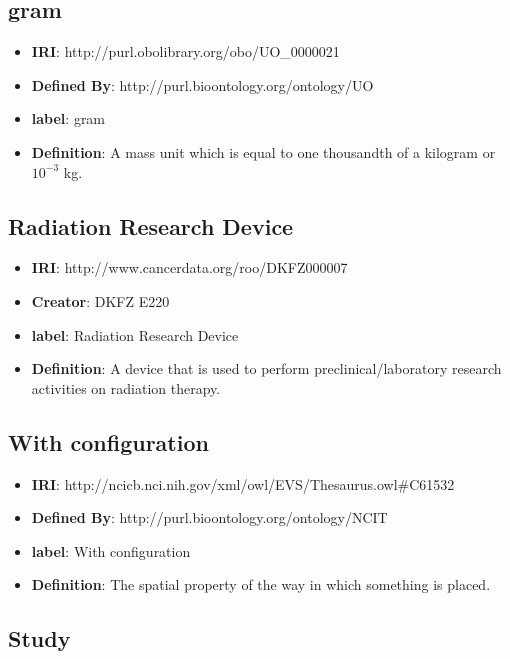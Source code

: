 \documentclass[a4paper,12pt,oneside]{article}
\begin{document}
  \subsection {gram}

  \begin{itemize}
     \item \textbf{IRI}: http://purl.obolibrary.org/obo/UO\_0000021
     \item \textbf{Defined By}: http://purl.bioontology.org/ontology/UO
     \item \textbf{label}: gram
     \item \textbf{Definition}: A mass unit which is equal to one thousandth of a kilogram or $10^{-3}$ kg.
  \end{itemize}
  
  \subsection{Radiation Research Device}

\begin{itemize}
	\item \textbf{IRI}: http://www.cancerdata.org/roo/DKFZ000007
	\item \textbf{Creator}: DKFZ E220
	\item \textbf{label}: Radiation Research Device
	\item \textbf{Definition}: A device that is used to perform preclinical/laboratory research activities on radiation therapy.
\end{itemize}
  
  \subsection{With configuration}

\begin{itemize}
	\item \textbf{IRI}: http://ncicb.nci.nih.gov/xml/owl/EVS/Thesaurus.owl\#C61532
	\item \textbf{Defined By}: http://purl.bioontology.org/ontology/NCIT
	\item \textbf{label}: With configuration
	\item \textbf{Definition}: The spatial property of the way in which something is placed.
\end{itemize}

  \subsection{Study}
\end{document}
